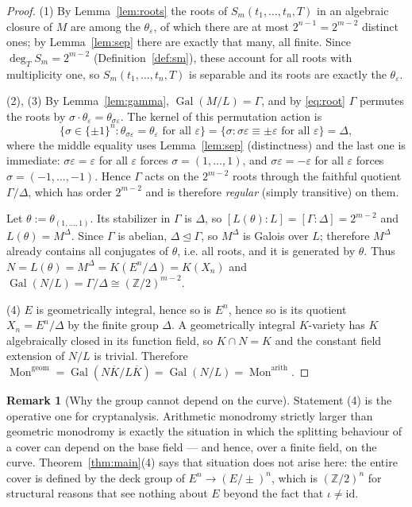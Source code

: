 \documentclass[11pt,a4paper]{article}
\theoremstyle{plain}
\theoremstyle{definition}
\newtheorem{remark}[theorem]{Remark}
\DeclareMathOperator{\Gal}{Gal}
\DeclareMathOperator{\Mon}{Mon}
\newcommand{\ZZ}{\mathbb{Z}}
\newcommand{\eps}{\varepsilon}
\begin{document}
\begin{proof}
(1) By Lemma~\ref{lem:roots} the roots of $S_m(t_1,\dots,t_n,T)$ in an algebraic
closure of $M$ are among the $\theta_{\eps}$, of which there are at most
$2^{n-1} = 2^{m-2}$ distinct ones; by Lemma~\ref{lem:sep} there are exactly that
many, all finite. Since $\deg_T S_m = 2^{m-2}$ (Definition~\ref{def:sm}), these
account for all roots with multiplicity one, so $S_m(t_1,\dots,t_n,T)$ is
separable and its roots are exactly the $\theta_{\eps}$.

(2), (3) By Lemma~\ref{lem:gamma}, $\Gal(M/L) = \Gamma$, and by \eqref{eq:root}
$\Gamma$ permutes the roots by $\sigma \cdot \theta_{\eps} = \theta_{\sigma\eps}$.
The kernel of this permutation action is
\[
  \{ \sigma \in \{\pm1\}^n : \theta_{\sigma\eps} = \theta_{\eps}
      \text{ for all } \eps \}
  = \{ \sigma : \sigma\eps \equiv \pm \eps \text{ for all } \eps \}
  = \Delta,
\]
where the middle equality uses Lemma~\ref{lem:sep} (distinctness) and the last one
is immediate: $\sigma\eps = \eps$ for all $\eps$ forces $\sigma = (1,\dots,1)$, and
$\sigma\eps = -\eps$ for all $\eps$ forces $\sigma = (-1,\dots,-1)$. Hence
$\Gamma$ acts on the $2^{m-2}$ roots through the faithful quotient $\Gamma/\Delta$,
which has order $2^{m-2}$ and is therefore \emph{regular} (simply transitive) on
them.

Let $\theta := \theta_{(1,\dots,1)}$. Its stabilizer in $\Gamma$ is $\Delta$, so
$[L(\theta):L] = [\Gamma : \Delta] = 2^{m-2}$ and $L(\theta) = M^{\Delta}$. Since
$\Gamma$ is abelian, $\Delta \trianglelefteq \Gamma$, so $M^{\Delta}$ is Galois
over $L$; therefore $M^{\Delta}$ already contains all conjugates of $\theta$, i.e.
all roots, and it is generated by $\theta$. Thus $N = L(\theta) = M^{\Delta} =
K(E^n/\Delta) = K(X_n)$ and $\Gal(N/L) = \Gamma/\Delta \cong (\ZZ/2)^{m-2}$.

(4) $E$ is geometrically integral, hence so is $E^n$, hence so is its quotient
$X_n = E^n/\Delta$ by the finite group $\Delta$. A geometrically integral
$K$-variety has $K$ algebraically closed in its function field, so
$K \cap N = K$ and the constant field extension of $N/L$ is trivial. Therefore
$\Mon^{\mathrm{geom}} = \Gal(N\overline{K}/L\overline{K}) = \Gal(N/L) =
\Mon^{\mathrm{arith}}$.
\end{proof}

\begin{remark}[Why the group cannot depend on the curve]\label{rem:whyfixed}
Statement (4) is the operative one for cryptanalysis. Arithmetic monodromy
strictly larger than geometric monodromy is exactly the situation in which the
splitting behaviour of a cover can depend on the base field --- and hence, over a
finite field, on the curve. Theorem~\ref{thm:main}(4) says that situation does
not arise here: the entire cover is defined by the deck group of
$E^n \to (E/{\pm})^n$, which is $(\ZZ/2)^n$ for structural reasons that see
nothing about $E$ beyond the fact that $\iota \neq \mathrm{id}$.
\end{remark}
\end{document}
